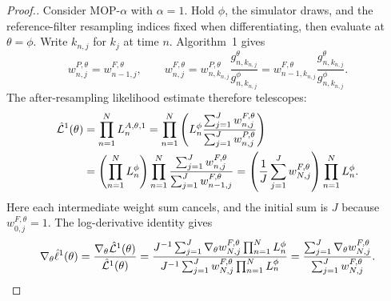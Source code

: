 \documentclass[11pt]{article}
\theoremstyle{thmstylethree}%
\begin{document}
\fi
\begin{proof}[Proof.]
Consider MOP-$\alpha$ with $\alpha=1$. Hold $\phi$, the simulator draws,
and the reference-filter resampling indices fixed when differentiating,
then evaluate at $\theta=\phi$. Write $k_{n,j}$ for $k_j$ at time $n$.
Algorithm~1 gives
\begin{equation}
w_{n,j}^{P,\theta}=w_{n-1,j}^{F,\theta},\qquad
w_{n,j}^{F,\theta}
=w_{n,k_{n,j}}^{P,\theta}\frac{g_{n,k_{n,j}}^\theta}{g_{n,k_{n,j}}^\phi}
=w_{n-1,k_{n,j}}^{F,\theta}\frac{g_{n,k_{n,j}}^\theta}{g_{n,k_{n,j}}^\phi}.
\label{eq:lemma-s1-filtered-recursion}
\end{equation}
The after-resampling likelihood estimate therefore telescopes:
\begin{align}
\hat{\mathcal{L}}^1(\theta)
&=\prod_{n=1}^N L_n^{A,\theta,1}
 =\prod_{n=1}^N\left(L_n^\phi
 \frac{\sum_{j=1}^Jw_{n,j}^{F,\theta}}{\sum_{j=1}^Jw_{n,j}^{P,\theta}}\right)
 \notag\\*
&=\left(\prod_{n=1}^N L_n^\phi\right)
 \prod_{n=1}^N\frac{\sum_{j=1}^Jw_{n,j}^{F,\theta}}
                       {\sum_{j=1}^Jw_{n-1,j}^{F,\theta}}
 =\left(\frac1J\sum_{j=1}^Jw_{N,j}^{F,\theta}\right)
  \prod_{n=1}^N L_n^\phi.
\label{eq:lemma-s1-telescoping}
\end{align}
Here each intermediate weight sum cancels, and the initial sum is $J$
because $w_{0,j}^{F,\theta}=1$. The log-derivative identity gives
\begin{equation}
\nabla_\theta\hat\ell^1(\theta)
=\frac{\nabla_\theta\hat{\mathcal{L}}^1(\theta)}{\hat{\mathcal{L}}^1(\theta)}
=\frac{J^{-1}\sum_{j=1}^J\nabla_\theta w_{N,j}^{F,\theta}
       \prod_{n=1}^N L_n^\phi}
       {J^{-1}\sum_{j=1}^Jw_{N,j}^{F,\theta}
       \prod_{n=1}^N L_n^\phi}
=\frac{\sum_{j=1}^J\nabla_\theta w_{N,j}^{F,\theta}}
       {\sum_{j=1}^Jw_{N,j}^{F,\theta}}.
\label{eq:log-derivative-identity}
\end{equation}


\end{proof}
\end{document}
